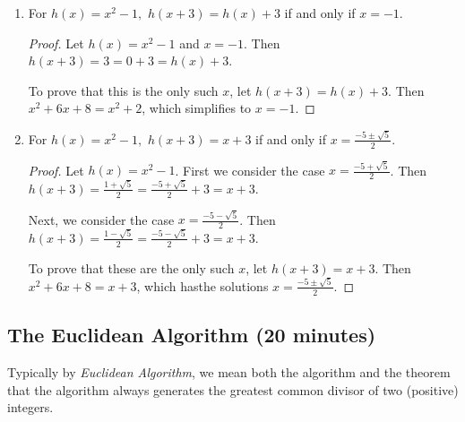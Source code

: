 \documentclass{../ximera}
\begin{document}
\begin{example}
\begin{enumerate}
\begin{solution}
			\begin{enumerate}
				\item For $h(x)=x^2-1,$ $h(x+3)=h(x)+3$ if and only if $x=-1$.
				\begin{proof}
					Let $h(x)=x^2-1$ and $x=-1$. Then $h(x+3)=3=0+3=h(x)+3$.

					To prove that this is the only such $x$, let $h(x+3)=h(x)+3$. Then $x^2+6x+8=x^2+2$, which simplifies to $x=-1$.
				\end{proof}
				\item For $h(x)=x^2-1,$ $h(x+3)=x+3$ if and only if $x=\frac{-5\pm\sqrt{5}}{2}$.
				\begin{proof}
					Let $h(x)=x^2-1$. First we consider the case $x=\frac{-5+\sqrt{5}}{2}$. Then $h(x+3)=\frac{1+\sqrt{5}}{2}=
					\frac{-5+\sqrt{5}}{2}+3=x+3$. 
					
					Next, we consider the case $x=\frac{-5-\sqrt{5}}{2}$. Then $h(x+3)=\frac{1-\sqrt{5}}{2}=
					\frac{-5-\sqrt{5}}{2}+3=x+3$.

					To prove that these are the only such $x$, let $h(x+3)=x+3$. Then $x^2+6x+8=x+3$, which  hasthe solutions  $x=\frac{-5\pm\sqrt{5}}{2}$.
				\end{proof}
			\end{enumerate}
		\end{solution}
	\end{enumerate}
\end{example}

\subsection{The Euclidean Algorithm (20 minutes)}

Typically by \emph{Euclidean Algorithm}, we mean  both the algorithm and the theorem that the algorithm always generates the greatest common divisor of two (positive) integers.
\end{document}
